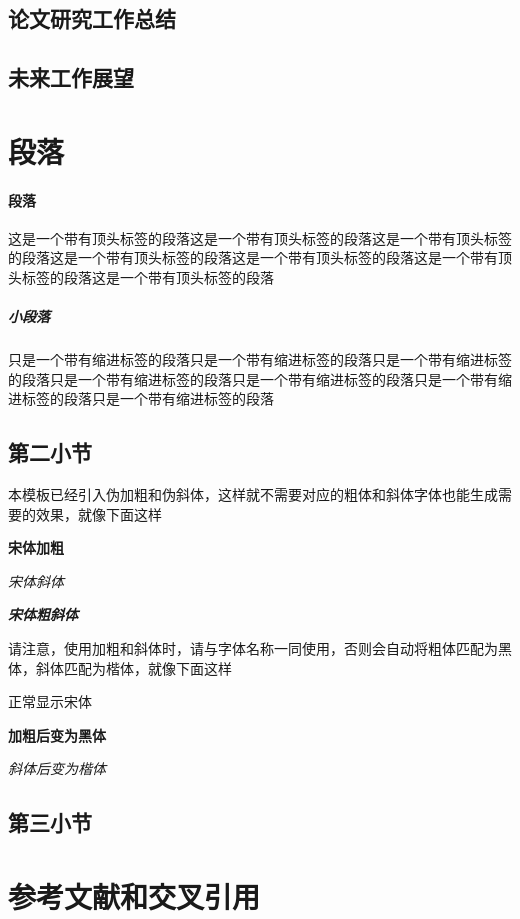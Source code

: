 \documentclass[supercite]{HustGraduPaper}
\begin{document}
\subsection{论文研究工作总结}
\subsection{未来工作展望}
\section{段落}
\paragraph{段落}\label{para:para}这是一个带有顶头标签的段落这是一个带有顶头标签的段落这是一个带有顶头标签的段落这是一个带有顶头标签的段落这是一个带有顶头标签的段落这是一个带有顶头标签的段落这是一个带有顶头标签的段落
\subparagraph{小段落}\label{subpara:subpara}只是一个带有缩进标签的段落只是一个带有缩进标签的段落只是一个带有缩进标签的段落只是一个带有缩进标签的段落只是一个带有缩进标签的段落只是一个带有缩进标签的段落只是一个带有缩进标签的段落
\subsection{第二小节}
本模板已经引入伪加粗和伪斜体，这样就不需要对应的粗体和斜体字体也能生成需要的效果，就像下面这样

{\songti \bfseries 宋体加粗}

{\songti \itshape 宋体斜体}

{\songti \bfseries \itshape 宋体粗斜体}

请注意，使用加粗和斜体时，请与字体名称一同使用，否则会自动将粗体匹配为黑体，斜体匹配为楷体，就像下面这样

{正常显示宋体}

{\bfseries 加粗后变为黑体}

{\itshape 斜体后变为楷体}

\subsection{第三小节}










\section{参考文献和交叉引用}\label{sec:ref}
\end{document}
